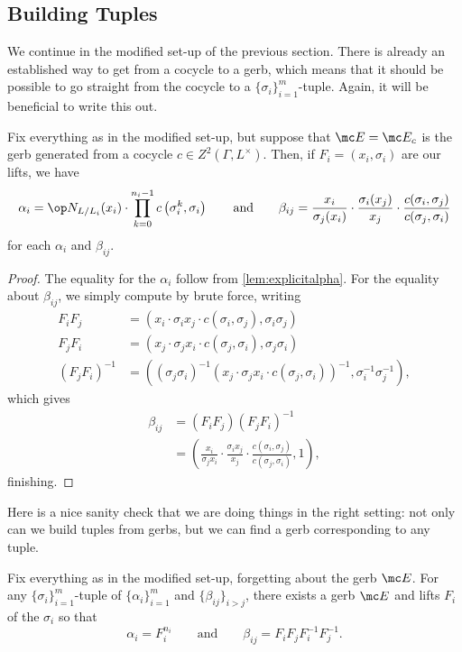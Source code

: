 \documentclass{article}
\numberwithin{equation}{section}
\begin{document}
\subsection{Building Tuples}
We continue in the modified set-up of the previous section. There is already an established way to get from a cocycle to a gerb, which means that it should be possible to go straight from the cocycle to a $\{\sigma_i\}_{i=1}^m$-tuple. Again, it will be beneficial to write this out.
\begin{lemma} \label{lem:explicitalphabeta}
	Fix everything as in the modified set-up, but suppose that $\mc E=\mc E_c$ is the gerb generated from a cocycle $c\in Z^2(\Gamma,L^\times)$. Then, if $F_i=(x_i,\sigma_i)$ are our lifts, we have
	\[\alpha_i=\op N_{L/L_i}(x_i)\cdot\prod_{k=0}^{n_i-1}c\left(\sigma_i^k,\sigma_i\right)\qquad\text{and}\qquad\beta_{ij}=\frac{x_i}{\sigma_j(x_i)}\cdot\frac{\sigma_i(x_j)}{x_j}\cdot\frac{c(\sigma_i,\sigma_j)}{c(\sigma_j,\sigma_i)}\]
	for each $\alpha_i$ and $\beta_{ij}$.
\end{lemma}
\begin{proof}
	The equality for the $\alpha_i$ follow from \autoref{lem:explicitalpha}. For the equality about $\beta_{ij}$, we simply compute
	by brute force, writing
    \begin{align*}
        F_iF_j &= (x_i\cdot\sigma_ix_j\cdot c(\sigma_i,\sigma_j),\sigma_i\sigma_j) \\
        F_jF_i &= (x_j\cdot\sigma_jx_i\cdot c(\sigma_j,\sigma_i),\sigma_j\sigma_i) \\
        (F_jF_i)^{-1} &= \left((\sigma_j\sigma_i)^{-1}(x_j\cdot\sigma_jx_i\cdot c(\sigma_j,\sigma_i))^{-1},\sigma_i^{-1}\sigma_j^{-1}\right),
    \end{align*}
    which gives
    \begin{align*}
        \beta_{ij} &= (F_iF_j)(F_jF_i)^{-1} \\
        &= \left(\frac{x_i}{\sigma_jx_i}\cdot\frac{\sigma_ix_j}{x_j}\cdot\frac{c(\sigma_i,\sigma_j)}{c(\sigma_j,\sigma_i)},1\right),
    \end{align*}
	finishing.
\end{proof}
Here is a nice sanity check that we are doing things in the right setting: not only can we build tuples from gerbs, but we can find a gerb corresponding to any tuple.
\begin{cor} \label{cor:alltuplesfromgerbs}
	Fix everything as in the modified set-up, forgetting about the gerb $\mc E$. For any $\{\sigma_i\}_{i=1}^m$-tuple of $\{\alpha_i\}_{i=1}^m$ and $\{\beta_{ij}\}_{i>j}$, there exists a gerb $\mc E$ and lifts $F_i$ of the $\sigma_i$ so that
	\[\alpha_i=F_i^{n_i}\qquad\text{and}\qquad\beta_{ij}=F_iF_jF_i^{-1}F_j^{-1}.\]
\end{cor}
\end{document}
